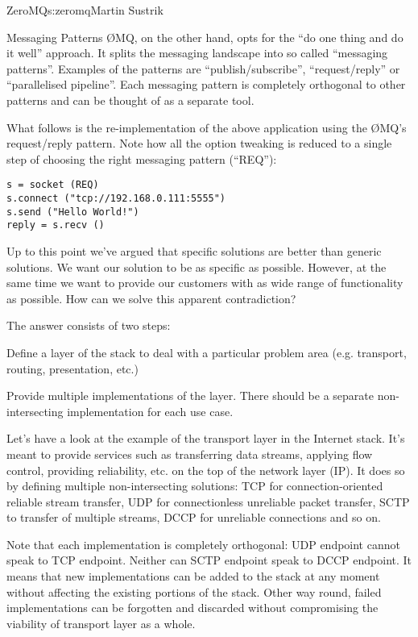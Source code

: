 \begin{aosachapter}{ZeroMQ}{s:zeromq}{Martin Sustrik}
\begin{aosasect1}{Messaging Patterns}
{\O}MQ, on the other hand, opts for the ``do one thing and do it well''
approach. It splits the messaging landscape into so called ``messaging
patterns''. Examples of the patterns are ``publish/subscribe'',
``request/reply'' or ``parallelised pipeline''. Each messaging pattern
is completely orthogonal to other patterns and can be thought of as a
separate tool.

What follows is the re-implementation of the above application using
the {\O}MQ's request/reply pattern. Note how all the option tweaking is
reduced to a single step of choosing the right messaging pattern
(``REQ''):

\begin{verbatim}
s = socket (REQ)
s.connect ("tcp://192.168.0.111:5555")
s.send ("Hello World!")
reply = s.recv ()
\end{verbatim}

Up to this point we've argued that specific solutions are better than
generic solutions. We want our solution to be as specific as
possible. However, at the same time we want to provide our customers
with as wide range of functionality as possible. How can we solve this
apparent contradiction?

The answer consists of two steps:

\begin{aosaenumerate}

\item Define a layer of the stack to deal with a particular problem
  area (e.g. transport, routing, presentation, etc.)

\item Provide multiple implementations of the layer. There should be a
  separate non-intersecting implementation for each use case.

\end{aosaenumerate}

Let's have a look at the example of the transport layer in the
Internet stack. It's meant to provide services such as transferring
data streams, applying flow control, providing reliability, etc. on the
top of the network layer (IP). It does so by defining multiple
non-intersecting solutions: TCP for connection-oriented reliable
stream transfer, UDP for connectionless unreliable packet transfer,
SCTP to transfer of multiple streams, DCCP for unreliable connections
and so on.

Note that each implementation is completely orthogonal: UDP endpoint
cannot speak to TCP endpoint. Neither can SCTP endpoint speak to DCCP
endpoint. It means that new implementations can be added to the stack
at any moment without affecting the existing portions of the
stack. Other way round, failed implementations can be forgotten and
discarded without compromising the viability of transport layer as a
whole.


\end{aosasect1}
\end{aosachapter}
